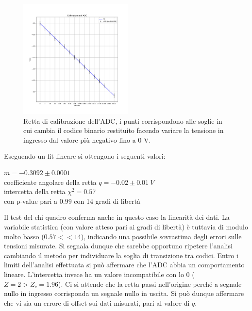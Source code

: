 \documentclass[journal]{IEEEtran}
\begin{document}
\begin{figure}[H]%
\centering
\begin{center}
\includegraphics[width=0.51\textwidth]{analysis/output/calibrazione_adc.pdf}
\end{center}
\caption{Retta di calibrazione dell'ADC, i punti corrispondono alle soglie in cui cambia il codice binario restituito facendo variare la tensione in ingresso dal valore più negativo fino a 0 V.}
\label{fig:graph_calibrazione_adc}
\end{figure}

Eseguendo un fit lineare si ottengono i seguenti valori:
\newline

$ m = -0.3092 \pm 0.0001 $ \\ coefficiente angolare della retta
$ q = -0.02 \pm 0.01 \ V$ \\ intercetta della retta 
$ \chi^{2} = 0.57 $ \\ con p-value pari a $0.99$ con 14 gradi di libertà

Il test del chi quadro conferma anche in questo caso la linearità dei dati. La variabile statistica (con valore atteso pari ai gradi di libertà) è tuttavia di modulo molto basso ($0.57 << 14$), indicando una possibile sovrastima degli errori sulle tensioni misurate. Si segnala dunque che sarebbe opportuno ripetere l'analisi cambiando il metodo per individuare la soglia di transizione tra codici. Entro i limiti dell'analisi effettuata si può affermare che l'ADC abbia un comportamento lineare.
L'intercetta invece ha un valore incompatibile con lo 0 ($Z = 2 > Z_c = 1.96$). Ci si attende che la retta passi nell'origine perché a segnale nullo in ingresso corrisponda un segnale nullo in uscita. Si può dunque affermare che vi sia un errore di offset sui dati misurati, pari al valore di $q$.
\end{document}
